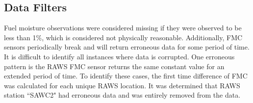 \subsection{Data Filters}

Fuel moisture observations were considered missing if they were observed to be less than 1\%, which is considered not physically reasonable. Additionally, FMC sensors periodically break and will return erroneous data for some period of time. It is difficult to identify all instances where data is corrupted. One erroneous pattern is the RAWS FMC sensor returns the same constant value for an extended period of time. To identify these cases, the first time difference of FMC was calculated for each unique RAWS location. It was determined that RAWS station ``SAWC2" had erroneous data and was entirely removed from the data.


